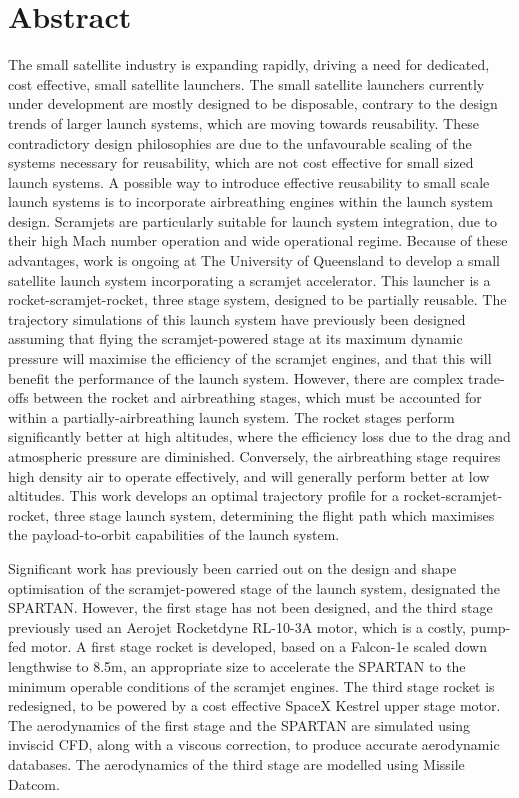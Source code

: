 \cleardoublepage

\section*{Abstract}

 The small satellite industry is expanding rapidly, driving a need for dedicated, cost effective, small satellite launchers. The small satellite launchers currently under development are mostly designed to be disposable,  contrary to the design trends of larger launch systems, which are moving towards reusability. These contradictory design philosophies are due to the unfavourable scaling of the systems necessary for reusability, which are not cost effective for small sized launch systems. 
 A possible way to introduce effective reusability to small scale launch systems is to incorporate airbreathing engines within the launch system design. Scramjets are particularly suitable for launch system integration, due to their high Mach number operation and wide operational regime. 
 Because of these advantages, work is ongoing at The University of Queensland to develop a small satellite launch system incorporating a scramjet accelerator. This launcher is a rocket-scramjet-rocket, three stage system, designed to be partially reusable. 
 The trajectory simulations of this launch system have previously been designed assuming that flying the scramjet-powered stage at its maximum dynamic pressure will maximise the efficiency of the scramjet engines, and that this will benefit the performance of the launch system. 
 However, there are complex trade-offs between the rocket and airbreathing stages, which must be accounted for within a partially-airbreathing launch system. The rocket stages perform significantly better at high altitudes, where the efficiency loss due to the drag and atmospheric pressure are diminished. Conversely, the airbreathing stage requires high density air to operate effectively, and will generally perform better at low altitudes. 
 This work develops an optimal trajectory profile for a rocket-scramjet-rocket, three stage launch system, determining the flight path which maximises the payload-to-orbit capabilities of the launch system. 
 
 Significant work has previously been carried out on the design and shape optimisation of the scramjet-powered stage of the launch system, designated the SPARTAN. 
 However, the first stage has not been designed, and the third stage previously used an Aerojet Rocketdyne RL-10-3A motor, which is a costly, pump-fed motor. 
 A first stage rocket is developed, based on a Falcon-1e scaled down lengthwise to 8.5m, an appropriate size to accelerate the SPARTAN to the minimum operable conditions of the scramjet engines. The third stage rocket is redesigned, to be powered by a cost effective SpaceX Kestrel upper stage motor. 
 The aerodynamics of the first stage and the SPARTAN are simulated using inviscid CFD, along with a viscous correction, to produce accurate aerodynamic databases.  
 The aerodynamics of the third stage are modelled using Missile Datcom.
 
